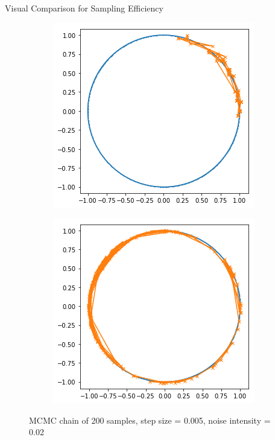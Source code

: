 \documentclass[10pt]{beamer}
\begin{document}
\begin{frame}[fragile]{Visual Comparison for Sampling Efficiency}
       \begin{figure}
       
        \begin{subfigure}[b]{0.42\textwidth}
            \includegraphics[width=\textwidth]{v_samples.png}
        \end{subfigure}%
        \qquad \qquad
        \begin{subfigure}[b]{0.42\textwidth}
            \includegraphics[width=\textwidth]{samples.png}
        \end{subfigure}
        \caption{MCMC chain of 200 samples, step size = 0.005, noise intensity = 0.02}
    \end{figure}
\end{frame}
\end{document}

